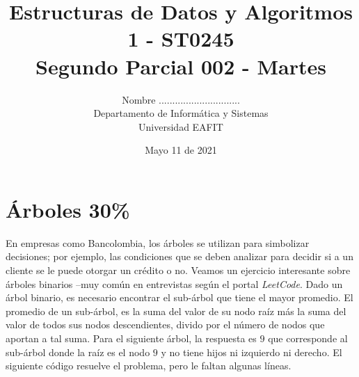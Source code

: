 \documentclass[10 pt]{article}
\title{\textbf {Estructuras de Datos y Algoritmos 1 - ST0245\\Segundo Parcial 002 - Martes}}
\author{Nombre ..............................\\
		Departamento de Informática y Sistemas\\
		Universidad EAFIT\\}
\date{Mayo 11 de 2021}
\begin{document}
\lstset{language=Java,frame=none, breaklines=true, numbers = left, stepnumber = 1, xleftmargin=5.0ex, showstringspaces=false, showspaces=false }
\lstset{language=Python,frame=none, breaklines=true, numbers = left, stepnumber = 1, xleftmargin=5.0ex, showstringspaces=false,showspaces=false }
\maketitle

\section{Árboles 30\%}
\begin{multicols}{2}
En empresas como Bancolombia, los árboles se utilizan para simbolizar decisiones; por ejemplo, las condiciones que se deben analizar para decidir
si a un cliente se le puede otorgar un crédito o no. Veamos un ejercicio interesante sobre árboles binarios --muy común en entrevistas según el portal
\emph{LeetCode}. 
Dado un árbol binario, es necesario encontrar el sub-árbol que tiene el mayor promedio. El promedio de un sub-árbol, es la suma del valor de su nodo raíz más la suma del valor de todos sus nodos descendientes, divido por el número de nodos que aportan a tal suma. Para el siguiente árbol, la respuesta es $9$ que corresponde al sub-árbol donde la raíz es el nodo $9$ y no tiene hijos ni izquierdo ni derecho. El siguiente código resuelve el problema, pero le faltan algunas líneas.

\begin{center}
  \end{center}
\end{multicols}
\end{document}
